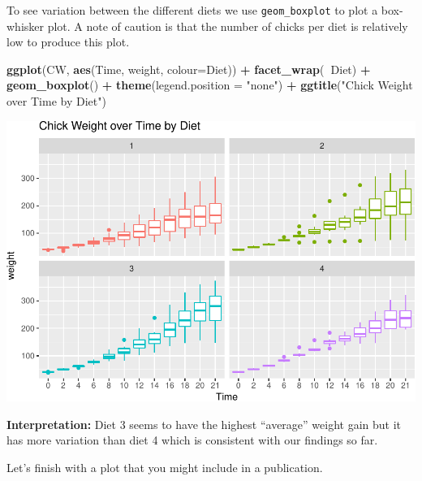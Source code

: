 \documentclass[]{book}
\newenvironment{Shaded}{\begin{snugshade}}{\end{snugshade}}
\newcommand{\DataTypeTok}[1]{\textcolor[rgb]{0.13,0.29,0.53}{#1}}
\newcommand{\KeywordTok}[1]{\textcolor[rgb]{0.13,0.29,0.53}{\textbf{#1}}}
\newcommand{\NormalTok}[1]{#1}
\newcommand{\OperatorTok}[1]{\textcolor[rgb]{0.81,0.36,0.00}{\textbf{#1}}}
\newcommand{\StringTok}[1]{\textcolor[rgb]{0.31,0.60,0.02}{#1}}
\theoremstyle{definition}
\theoremstyle{definition}
\theoremstyle{definition}
\theoremstyle{remark}
\begin{document}
To see variation between the different diets we use \texttt{geom\_boxplot} to plot a box-whisker plot.
A note of caution is that the number of chicks per diet is relatively low to produce this plot.

\begin{Shaded}
\begin{Highlighting}[]
\KeywordTok{ggplot}\NormalTok{(CW, }\KeywordTok{aes}\NormalTok{(Time, weight, }\DataTypeTok{colour=}\NormalTok{Diet)) }\OperatorTok{+}
\StringTok{  }\KeywordTok{facet_wrap}\NormalTok{(}\OperatorTok{~}\NormalTok{Diet) }\OperatorTok{+}
\StringTok{  }\KeywordTok{geom_boxplot}\NormalTok{() }\OperatorTok{+}
\StringTok{  }\KeywordTok{theme}\NormalTok{(}\DataTypeTok{legend.position =} \StringTok{"none"}\NormalTok{) }\OperatorTok{+}
\StringTok{  }\KeywordTok{ggtitle}\NormalTok{(}\StringTok{"Chick Weight over Time by Diet"}\NormalTok{)}
\end{Highlighting}
\end{Shaded}

\includegraphics{01-Introduction-to-R_files/figure-latex/boxPlot-1.pdf}

\textbf{Interpretation:}
Diet 3 seems to have the highest ``average'' weight gain but it has more variation
than diet 4 which is consistent with our findings so far.

Let's finish with a plot that you might include in a publication.
\end{document}
